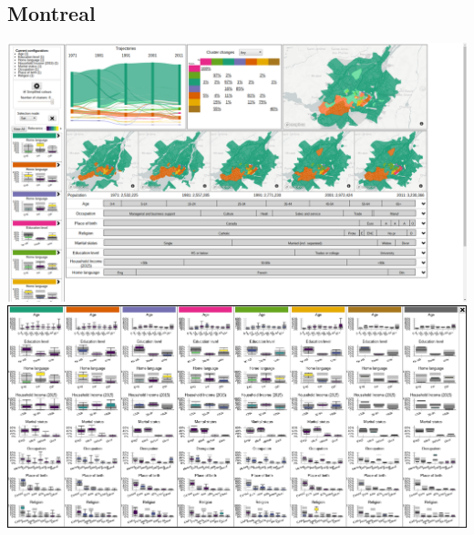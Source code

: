 \documentclass[a4paper]{article}
\begin{document}
\subsection{Montreal}
\begin{center}
    \includegraphics[width=\linewidth]{41a.png}
    \includegraphics[width=\linewidth]{41b.png}
\end{center}
\end{document}
